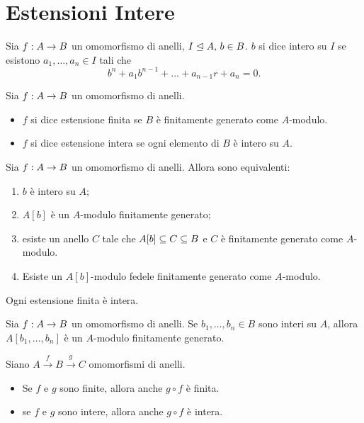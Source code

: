 \section{Estensioni Intere}

\begin{definition}
Sia $f:A\rightarrow B$ un omomorfismo di anelli, $I\trianglelefteq A,\,\allowbreak b\in B$. $b$ si dice intero su $I$ se esistono $a_1,\ldots,a_n\in I$ tali che
$$
b^n+a_1b^{n-1}+\ldots+a_{n-1}r+a_n=0.
$$
\end{definition}
\begin{definition}
Sia $f:A\rightarrow B$ un omomorfismo di anelli.
\begin{itemize}
\item $f$ si dice estensione finita se $B$ è finitamente generato come $A$-modulo.
\item $f$ si dice estensione intera se ogni elemento di $B$ è intero su $A$.
\end{itemize}
\end{definition}
\begin{proposition}
Sia $f:A\rightarrow B$ un omomorfismo di anelli. Allora sono equivalenti:
\begin{enumerate}
\item $b$ è intero su $A$;
\item $A[b]$ è un $A$-modulo finitamente generato;
\item esiste un anello $C$ tale che $A[b]\subseteq C\subseteq B$ e $C$ è finitamente generato come $A$-modulo.
\item Esiste un $A[b]$-modulo fedele finitamente generato come $A$-modulo.
\end{enumerate}
\end{proposition}
\begin{corollary}
Ogni estensione finita è intera.
\end{corollary}
\begin{corollary}
Sia $f:A\rightarrow B$ un omomorfismo di anelli. Se $b_1,\ldots,b_n\in B$ sono interi su $A$, allora $A[b_1,\ldots,b_n]$ è un $A$-modulo finitamente generato.
\end{corollary}
\begin{proposition}
Siano $A\xrightarrow{f}B\xrightarrow{g}C$ omomorfismi di anelli.
\begin{itemize}
\item Se $f$ e $g$ sono finite, allora anche $g\circ f$ è finita.
\item se $f$ e $g$ sono intere, allora anche $g\circ f$ è intera.
\end{itemize}
\end{proposition}
